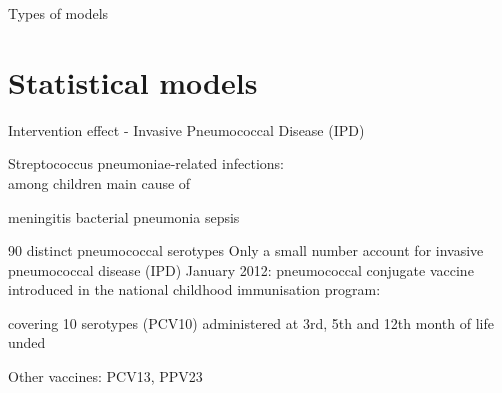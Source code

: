 \documentclass[table]{beamer}\usepackage[]{graphicx}\usepackage[]{color}
\begin{document}
\begin{frame}[fragile]{Types of models}
\end{frame}



\section{Statistical models}
\begin{frame}[fragile]{Intervention effect - Invasive Pneumococcal Disease (IPD)}


  Streptococcus pneumoniae-related infections:\\
  among children main cause of

    meningitis
    bacterial pneumonia
    sepsis

  90 distinct pneumococcal serotypes
  Only a small number account for invasive pneumococcal disease (IPD)
  January 2012: pneumococcal conjugate vaccine introduced in the national childhood immunisation program:

    covering 10 serotypes (PCV10)
    administered at 3rd, 5th and 12th month of life
    unded
 
  Other vaccines: PCV13, PPV23



\end{frame}
\end{document}
